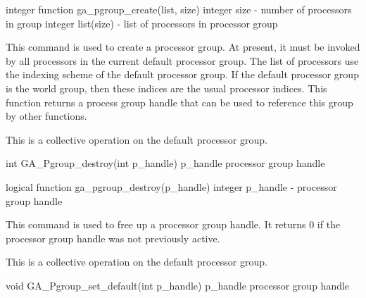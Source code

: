 \documentclass[12pt]{article}
\begin{document}
\begin{fapi}
integer function ga_pgroup_create(list, size)
   integer       size              - number of processors in group    \access{[input]} 
   integer       list(size)        - list of processors in processor
                                 group                                \access{[input]} 
\end{fapi}

\begin{desc}

  This command is used to create a processor group. At present, it
  must be invoked by all processors in the current default processor
  group. The list of processors use the indexing scheme of the default
  processor group. If the default processor group is the world group,
  then these indices are the usual processor indices. This function
  returns a process group handle that can be used to reference this
  group by other functions.

  This is a collective operation on the default processor group.

\end{desc}


\begin{capi}
int GA_Pgroup_destroy(int p_handle)
   p_handle                       processor group handle           \access{[input]} 
\end{capi}

\begin{fapi}
logical function ga_pgroup_destroy(p_handle)
   integer       p_handle           - processor group handle       \access{[input]} 
\end{fapi}

\begin{desc}

  This command is used to free up a processor group handle. It returns
  0 if the processor group handle was not previously active.

  This is a collective operation on the default processor group.

\end{desc}


\begin{capi}
void GA_Pgroup_set_default(int p_handle)
   p_handle                       processor group handle           \access{[input]} 
\end{capi}
\end{document}
